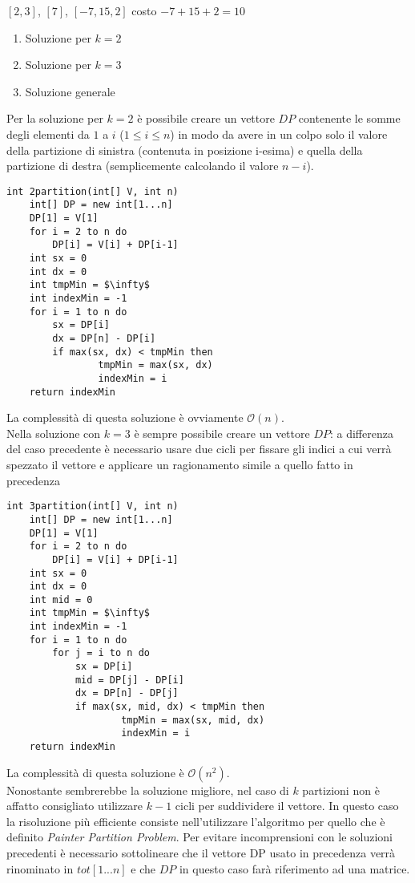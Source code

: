 \documentclass[../cheatSheetAlgoritmi.tex]{subfiles}
\begin{document}
$[2,3]$, $[7]$, $[-7,15,2]$	costo $- 7 + 15 + 2 = 10$
\begin{enumerate}
	\item Soluzione per $k= 2$
	\item Soluzione per $k= 3$
	\item Soluzione generale
\end{enumerate}
Per la soluzione per $k = 2$ è possibile creare un vettore $DP$ contenente le somme degli elementi da $1$ a $i$ ($1 \leq i \leq n$) in modo da avere in un colpo solo il valore della partizione di sinistra (contenuta in posizione i-esima) e quella della partizione di destra (semplicemente calcolando il valore $n - i$).
\begin{lstlisting}[caption=2-partizioni]
int 2partition(int[] V, int n)
	int[] DP = new int[1...n]
	DP[1] = V[1]
	for i = 2 to n do
		DP[i] = V[i] + DP[i-1]
	int sx = 0
	int dx = 0
	int tmpMin = $\infty$
	int indexMin = -1
	for i = 1 to n do
		sx = DP[i]
		dx = DP[n] - DP[i]
		if max(sx, dx) < tmpMin then
				tmpMin = max(sx, dx)
				indexMin = i
	return indexMin
\end{lstlisting}
La complessità di questa soluzione è ovviamente $\mathcal{O}(n)$.\\
Nella soluzione con $k=3$ è sempre possibile creare un vettore $DP$: a differenza del caso precedente è necessario usare due cicli per fissare gli indici a cui verrà spezzato il vettore e applicare un ragionamento simile a quello fatto in precedenza
\newpage
\begin{lstlisting}[caption=3-partizioni]
int 3partition(int[] V, int n)
	int[] DP = new int[1...n]
	DP[1] = V[1]
	for i = 2 to n do
		DP[i] = V[i] + DP[i-1]
	int sx = 0
	int dx = 0
	int mid = 0
	int tmpMin = $\infty$
	int indexMin = -1
	for i = 1 to n do
		for j = i to n do
			sx = DP[i]
			mid = DP[j] - DP[i]
			dx = DP[n] - DP[j]
			if max(sx, mid, dx) < tmpMin then
					tmpMin = max(sx, mid, dx)
					indexMin = i
	return indexMin
\end{lstlisting}
La complessità di questa soluzione è $\mathcal{O}(n^{2})$.\\
Nonostante sembrerebbe la soluzione migliore, nel caso di $k$ partizioni non è affatto consigliato utilizzare $k-1$ cicli per suddividere il vettore. In questo caso la risoluzione più efficiente consiste nell'utilizzare l'algoritmo per quello che è definito \emph{Painter Partition Problem}. Per evitare incomprensioni con le soluzioni precedenti è necessario sottolineare che il vettore DP usato in precedenza verrà rinominato in $tot[1...n]$ e che $DP$ in questo caso farà riferimento ad una matrice.\\
\end{document}
